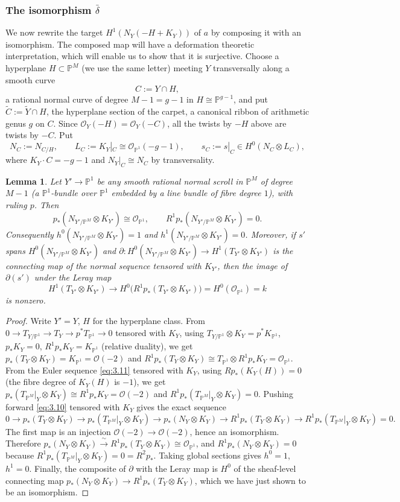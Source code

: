\documentclass[11pt,reqno]{amsart}
\theoremstyle{plain}
\newtheorem{lemma}[theorem]{Lemma}
\theoremstyle{definition}
\newcommand{\PP}{\mathbb{P}}
\newcommand{\PM}{\mathbb{P}^M}
\newcommand{\OO}{\mathcal{O}}
\newcommand{\Yt}{\widetilde{Y}}
\newcommand{\Ct}{\widetilde{C}}
\newcommand{\NY}{N_{Y}}
\newcommand{\TP}{T_{\PM}|_Y}
\begin{document}
\subsubsection{The isomorphism $\bar{\delta}$}\label{isomorphism_delta}
We now rewrite the target $H^1(\NY(-H+K_Y))$ of $a$ by composing it with an isomorphism. The composed map will have a deformation theoretic interpretation, which will enable us to show that it is surjective. Choose a hyperplane $H\subset\PM$ (we use the same letter) meeting $Y$ transversally along a smooth curve
\[
C:=Y\cap H ,
\]
a rational normal curve of degree $M-1=g-1$ in $H\cong\PP^{g-1}$, and put $\Ct:=\Yt\cap H$, the hyperplane section of the carpet, a canonical ribbon of arithmetic genus $g$ on $C$. Since $\OO_Y(-H)=\OO_Y(-C)$, all the twists by $-H$ above are twists by $-C$. Put
\[
N_C:=N_{C/H},\qquad L_C:=K_Y|_C\cong\OO_{\PP^1}(-g-1),\qquad s_C:=s|_C\in H^0(N_C\otimes L_C),
\]
where $K_Y\cdot C=-g-1$ and $N_Y|_C\cong N_C$ by transversality.

\begin{lemma}\label{lem:pushforward}
Let $Y'\to\PP^1$ be any smooth rational normal scroll in $\PM$ of degree $M-1$ (a $\PP^1$-bundle over $\PP^1$ embedded by a line bundle of fibre degree $1$), with ruling $p$. Then
\[
p_*(N_{Y'/\PM}\otimes K_{Y'})\cong\OO_{\PP^1},\qquad R^1p_*(N_{Y'/\PM}\otimes K_{Y'})=0 .
\]
Consequently $h^0(N_{Y'/\PM}\otimes K_{Y'})=1$ and $h^1(N_{Y'/\PM}\otimes K_{Y'})=0$. Moreover, if $s'$ spans $H^0(N_{Y'/\PM}\otimes K_{Y'})$ and $\partial\colon H^0(N_{Y'/\PM}\otimes K_{Y'})\to H^1(T_{Y'}\otimes K_{Y'})$ is the connecting map of the normal sequence tensored with $K_{Y'}$, then the image of $\partial(s')$ under the Leray map
\[
H^1(T_{Y'}\otimes K_{Y'})\longrightarrow H^0\big(R^1p_*(T_{Y'}\otimes K_{Y'})\big)=H^0(\OO_{\PP^1})=k
\]
is nonzero.
\end{lemma}

\begin{proof}
Write $Y'=Y$, $H$ for the hyperplane class. From $0\to T_{Y/\PP^1}\to T_Y\to p^*T_{\PP^1}\to 0$ tensored with $K_Y$, using $T_{Y/\PP^1}\otimes K_Y=p^*K_{\PP^1}$, $p_*K_Y=0$, $R^1p_*K_Y=K_{\PP^1}$ (relative duality), we get $p_*(T_Y\otimes K_Y)=K_{\PP^1}=\OO(-2)$ and $R^1p_*(T_Y\otimes K_Y)\cong T_{\PP^1}\otimes R^1p_*K_Y=\OO_{\PP^1}$. From the Euler sequence \eqref{eq:3.11} tensored with $K_Y$, using $Rp_*(K_Y(H))=0$ (the fibre degree of $K_Y(H)$ is $-1$), we get $p_*(\TP\otimes K_Y)\cong R^1p_*K_Y=\OO(-2)$ and $R^1p_*(\TP\otimes K_Y)=0$. Pushing forward \eqref{eq:3.10} tensored with $K_Y$ gives the exact sequence
\[
0\to p_*(T_Y\otimes K_Y)\to p_*(\TP\otimes K_Y)\to p_*(\NY\otimes K_Y)\to R^1p_*(T_Y\otimes K_Y)\to R^1p_*(\TP\otimes K_Y)=0 .
\]
The first map is an injection $\OO(-2)\to\OO(-2)$, hence an isomorphism. Therefore $p_*(\NY\otimes K_Y)\xrightarrow{\ \sim\ }R^1p_*(T_Y\otimes K_Y)\cong\OO_{\PP^1}$, and $R^1p_*(\NY\otimes K_Y)=0$ because $R^1p_*(\TP\otimes K_Y)=0=R^2p_*$. Taking global sections gives $h^0=1$, $h^1=0$. Finally, the composite of $\partial$ with the Leray map is $H^0$ of the sheaf-level connecting map $p_*(\NY\otimes K_Y)\to R^1p_*(T_Y\otimes K_Y)$, which we have just shown to be an isomorphism.
\end{proof}
\end{document}

